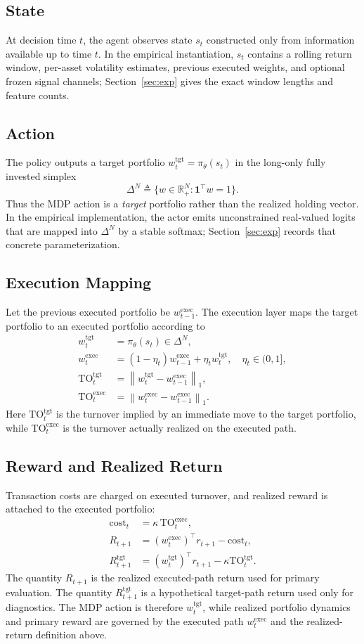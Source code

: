 \documentclass[10pt,twocolumn]{article}
\newcommand{\wexec}{w^{\mathrm{exec}}}
\newcommand{\wtgt}{w^{\mathrm{tgt}}}
\newcommand{\TOexec}{\mathrm{TO}^{\mathrm{exec}}}
\newcommand{\TOtgt}{\mathrm{TO}^{\mathrm{tgt}}}
\newcommand{\kappaTC}{\kappa}
\newcommand{\R}{\mathbb{R}}
\newcommand{\normone}[1]{\left\lVert #1 \right\rVert_1}
\newcommand{\DeltaN}{\Delta^N}
\begin{document}
\subsection{State}
At decision time $t$, the agent observes state $s_t$ constructed only from information available up to time $t$. In the empirical instantiation, $s_t$ contains a rolling return window, per-asset volatility estimates, previous executed weights, and optional frozen signal channels; Section~\ref{sec:exp} gives the exact window lengths and feature counts.

\subsection{Action}
The policy outputs a target portfolio $\wtgt_t=\pi_\theta(s_t)$ in the long-only fully invested simplex
\[
\DeltaN \triangleq \{w\in\R^N_+:\mathbf{1}^\top w=1\}.
\]
Thus the MDP action is a \emph{target} portfolio rather than the realized holding vector. In the empirical implementation, the actor emits unconstrained real-valued logits that are mapped into $\DeltaN$ by a stable softmax; Section~\ref{sec:exp} records that concrete parameterization.

\subsection{Execution Mapping}
Let the previous executed portfolio be $\wexec_{t-1}$. The execution layer maps the target portfolio to an executed portfolio according to
\begin{align*}
\wtgt_t &= \pi_\theta(s_t)\in\DeltaN, \\
\wexec_t &= (1-\eta_t)\wexec_{t-1} + \eta_t \wtgt_t,\quad \eta_t\in(0,1], \\
\TOtgt_t &= \normone{\wtgt_t - \wexec_{t-1}}, \\
\TOexec_t &= \normone{\wexec_t - \wexec_{t-1}}.
\end{align*}
Here $\TOtgt_t$ is the turnover implied by an immediate move to the target portfolio, while $\TOexec_t$ is the turnover actually realized on the executed path.

\subsection{Reward and Realized Return}
Transaction costs are charged on executed turnover, and realized reward is attached to the executed portfolio:
\begin{align*}
\mathrm{cost}_{t} &= \kappaTC \, \TOexec_t, \\
R_{t+1} &= (\wexec_t)^\top r_{t+1} - \mathrm{cost}_t, \\
R^{\mathrm{tgt}}_{t+1} &= (\wtgt_t)^\top r_{t+1} - \kappaTC \TOtgt_t.
\end{align*}
The quantity $R_{t+1}$ is the realized executed-path return used for primary evaluation. The quantity $R^{\mathrm{tgt}}_{t+1}$ is a hypothetical target-path return used only for diagnostics. The MDP action is therefore $\wtgt_t$, while realized portfolio dynamics and primary reward are governed by the executed path $\wexec_t$ and the realized-return definition above.
\end{document}

